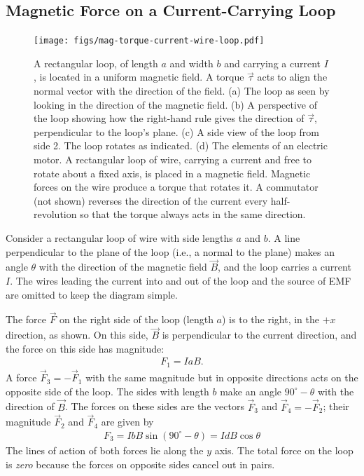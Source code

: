 \documentclass[12pt,b4paper]{article}
\begin{document}
\subsection{Magnetic Force on a Current-Carrying Loop}
\begin{figure}[H]
    \centering
    \texttt{[image: figs/mag-torque-current-wire-loop.pdf]}
    \caption{A rectangular loop, of length $a$ and width $b$ and carrying a current $I$, is located in a uniform magnetic field. A torque $\vec{\tau}$ acts to align the normal vector with the direction of the field. (a) The loop as seen by looking in the direction of the magnetic field. (b) A perspective of the loop showing how the right-hand rule gives the direction of $\vec{\tau}$, perpendicular to the loop's plane. (c) A side view of the loop from side 2. The loop rotates as indicated. (d) The elements of an electric motor. A rectangular loop of wire, carrying a current and free to rotate about a fixed axis, is placed in a magnetic field. Magnetic forces on the wire produce a torque that rotates it. A commutator (not shown) reverses the direction of the current every half-revolution so that the torque always acts in the same direction.}
    \label{fig:mag-torque-current-wire-loop}
\end{figure}
Consider a rectangular loop of wire with side lengths $a$ and $b$. A line perpendicular to the plane of the loop (i.e., a normal to the plane) makes an angle $\theta$ with the direction of the magnetic field $\vec{B}$, and the loop carries a current $I$. The wires leading the current into and out of the loop and the source of EMF are omitted to keep the diagram simple.

The force $\vec{F}$ on the right side of the loop (length $a$) is to the right, in the $+x$ direction, as
shown. On this side, $\vec{B}$ is perpendicular to the current direction, and the force on this side
has magnitude:
\begin{align}
    F_1=IaB.
\end{align}
A force $\vec{F}_3=-\vec{F}_1$ with the same magnitude but in opposite directions acts on the opposite side of the loop. The sides with length $b$ make an angle $90^\circ - \theta$ with the direction of $\vec{B}$. The forces on these sides are the vectors $\vec{F}_3$ and $\vec{F}_4=-\vec{F}_2$; their magnitude $\vec{F}_2$ and $\vec{F}_4$ are given by
\begin{align}
    F_3=IbB\sin(90^\circ-\theta)=IdB\cos\theta
\end{align}
The lines of action of both forces lie along the $y$ axis. The total force on the loop is \textit{zero} because the forces on opposite sides cancel out in pairs.
\end{document}
